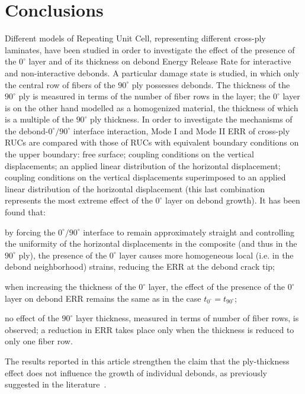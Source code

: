\documentclass[review]{elsarticle}
\begin{document}
\section{Conclusions}

Different models of Repeating Unit Cell, representing different cross-ply laminates, have been studied in order to investigate the effect of the presence of the $0^{\circ}$ layer and of its thickness on debond Energy Release Rate for interactive and non-interactive debonds. A particular damage state is studied, in which only the central row of fibers of the $90^{\circ}$ ply possesses debonds. The thickness of the $90^{\circ}$ ply is measured in terms of the number of fiber rows in the layer; the $0^{\circ}$ layer is on the other hand modelled as a homogenized material, the thickness of which is a multiple of the $90^{\circ}$ ply thickness. In order to investigate the mechanisms of the debond-$0^{\circ}/90^{\circ}$ interface interaction, Mode I and Mode II ERR of cross-ply RUCs are compared with those of RUCs with equivalent boundary conditions on the upper boundary: free surface; coupling conditions on the vertical displacements; an applied linear distribution of the horizontal displacement; coupling conditions on the vertical displacements superimposed to an applied linear distribution of the horizontal displacement (this last combination represents the most extreme effect of the $0^{\circ}$ layer on debond growth). It has been found that:
\begin{itemize}[\label={--}]
\item by forcing the $0^{\circ}/90^{\circ}$ interface to remain approximately straight and controlling the uniformity of the horizontal displacements in the composite (and thus in the $90^{\circ}$ ply), the presence of the $0^{\circ}$ layer causes more homogeneous local (i.e. in the debond neighborhood) strains, reducing the ERR at the debond crack tip;
\item when increasing the thickness of the $0^{\circ}$ layer, the effect of the presence of the $0^{\circ}$ layer on debond ERR remains the same as in the case $t_{0^{\circ}}=t_{90^{\circ}}$;
\item no effect of the $90^{\circ}$ layer thickness, measured in terms of number of fiber rows, is observed; a reduction in ERR takes place only when the thickness is reduced to only one fiber row.
\end{itemize}
The results reported in this article strengthen the claim that the ply-thickness effect does not influence the growth of individual debonds, as previously suggested in the literature~\cite{Saito2012,Herraez2015,Velasco2018, Paris2018}. 
\end{document}
